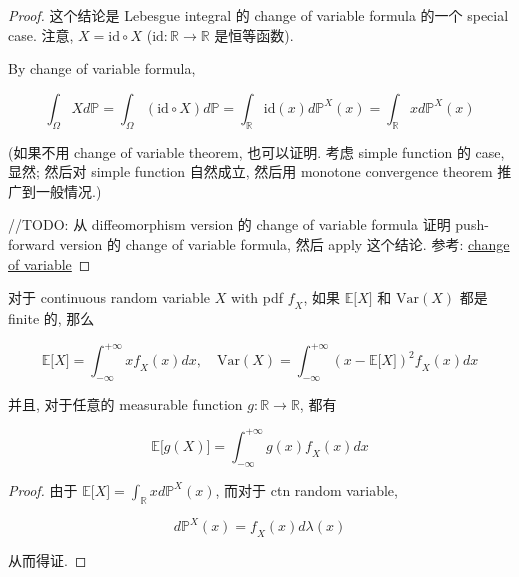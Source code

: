 \begin{proof}

这个结论是 Lebesgue integral 的 change of variable formula 的一个 special case. 注意, \(\mathit{X} = \text{id} \circ \mathit{X}\) (\(\text{id}:\mathbb{R}\rightarrow\mathbb{R}\) 是恒等函数).

By change of variable formula,

\[\int_{\Omega}\mathit{X}\mathit{d}\mathbb{P} = \int_{\Omega}(\text{id} \circ \mathit{X})\mathit{d}\mathbb{P} = \int_{\mathbb{R}}\text{id}(\mathit{x})\mathit{d}\mathbb{P}^{\mathit{X}}(\mathit{x}) = \int_{\mathbb{R}}\mathit{x}\mathit{d}\mathbb{P}^{\mathit{X}}(\mathit{x})\]

(如果不用 change of variable theorem, 也可以证明. 考虑 simple function 的 case, 显然; 然后对 simple function 自然成立, 然后用 monotone convergence theorem 推广到一般情况.)

//TODO: 从 diffeomorphism version 的 change of variable formula 证明 push-forward version 的 change of variable formula, 然后 apply 这个结论. 参考: \href{https://en.wikipedia.org/wiki/Change_of_variables}{change of variable}

\end{proof}

\begin{proposition}{}

对于 continuous random variable \(\mathit{X}\) with pdf \(\mathit{f}_{\mathit{X}}\), 如果 \(\mathbb{E}\lbrack\mathit{X}\rbrack\) 和 \(\text{Var}(\mathit{X})\) 都是 finite 的, 那么

\[\mathbb{E}\lbrack\mathit{X}\rbrack = \int_{- \infty}^{+ \infty}\mathit{x}\mathit{f}_{\mathit{X}}(\mathit{x})\mathit{d}\mathit{x},\quad\text{Var}(\mathit{X}) = \int_{- \infty}^{+ \infty}(\mathit{x} - \mathbb{E}\lbrack\mathit{X}\rbrack)^{2}\mathit{f}_{\mathit{X}}(\mathit{x})\mathit{d}\mathit{x}\]

并且, 对于任意的 measurable function \(\mathit{g}:\mathbb{R}\rightarrow\mathbb{R}\), 都有

\[\mathbb{E}\lbrack\mathit{g}(\mathit{X})\rbrack = \int_{- \infty}^{+ \infty}\mathit{g}(\mathit{x})\mathit{f}_{\mathit{X}}(\mathit{x})\mathit{d}\mathit{x}\]

\end{proposition}

\begin{proof}

由于 \(\mathbb{E}\lbrack\mathit{X}\rbrack = \int_{\mathbb{R}}\mathit{x}\mathit{d}\mathbb{P}^{\mathit{X}}(\mathit{x})\), 而对于 ctn random variable,

\[\mathit{d}\mathbb{P}^{\mathit{X}}(\mathit{x}) = \mathit{f}_{\mathit{X}}(\mathit{x})\mathit{d}\mathit{\lambda}(\mathit{x})\]

从而得证.

\end{proof}


